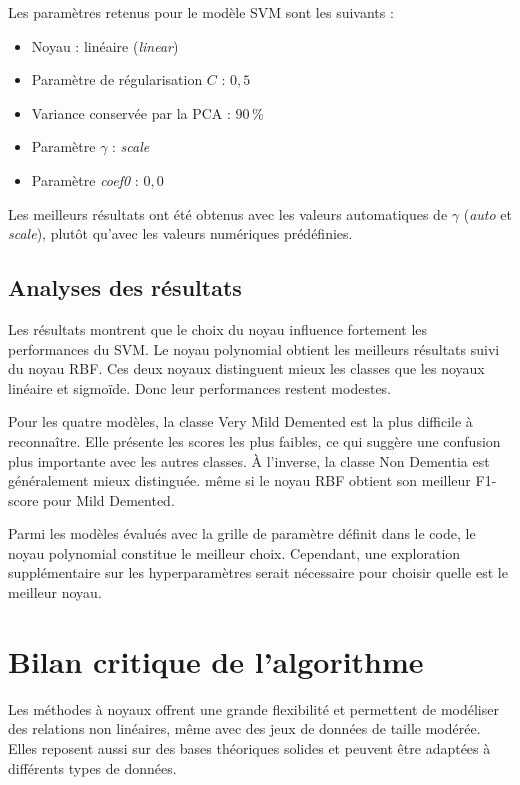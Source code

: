 \documentclass[12pt,twoside,letterpaper]{article}
\begin{document}
Les paramètres retenus pour le modèle SVM sont les suivants :
\begin{itemize}
    \item Noyau : linéaire (\textit{linear})
    \item Paramètre de régularisation \(C\) : \(0{,}5\)
    \item Variance conservée par la PCA : \(90\,\%\)
    \item Paramètre \(\gamma\) : \textit{scale}
    \item Paramètre \textit{coef0} : \(0{,}0\)
\end{itemize}
\vspace{0.5\baselineskip}
Les meilleurs résultats ont été obtenus avec les valeurs automatiques de
\(\gamma\) (\textit{auto} et \textit{scale}), plutôt qu'avec les valeurs
numériques prédéfinies.

\subsection{Analyses des résultats}
Les résultats montrent que le choix du noyau influence fortement les performances du SVM. 
Le noyau polynomial obtient les meilleurs résultats suivi du noyau RBF. Ces deux noyaux 
distinguent mieux les classes que les noyaux linéaire et sigmoïde. Donc leur performances 
restent modestes.\newline

Pour les quatre modèles, la classe Very Mild Demented est la plus difficile à reconnaître. 
Elle présente les scores les plus faibles, ce qui suggère une confusion plus importante avec 
les autres classes. À l'inverse, la classe Non Dementia est généralement mieux distinguée. 
même si le noyau RBF obtient son meilleur F1-score pour Mild Demented.\newline

Parmi les modèles évalués avec la grille de paramètre définit dans le code, le noyau polynomial constitue le 
meilleur choix. Cependant, une exploration supplémentaire sur les hyperparamètres serait 
nécessaire pour choisir quelle est le meilleur noyau.\newline
\newpage
\section{Bilan critique de l'algorithme}


Les méthodes à noyaux offrent une grande flexibilité et permettent de modéliser des 
relations non linéaires, même avec des jeux de données de taille modérée. 
Elles reposent aussi sur des bases théoriques solides et peuvent être adaptées 
à différents types de données.\newline
\end{document}
